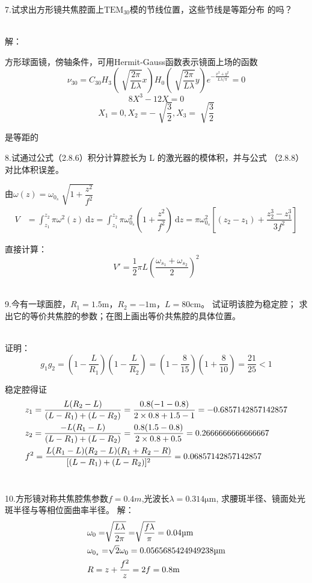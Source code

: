 \documentclass[12pt]{article}
\begin{document}
{\fangsong
7.试求出方形镜共焦腔面上$\mathrm{TEM_{30}}$模的节线位置，这些节线是等距分布
的吗？
}
{\kaishu\noindent
\\解：
\par 方形球面镜，傍轴条件，可用Hermit-Gauss函数表示镜面上场的函数
\[
	\nu_{30}=C_{30}
	H_3 \left( \sqrt[]{\dfrac{2\pi}{L\lambda} }x \right) 
	H_0 \left( \sqrt[]{\dfrac{2\pi}{L\lambda} }y \right) 
	e^{-\frac{x^2+y^2}{L\lambda/\pi} }=0
\]
\[
	8X^3-12X=0
\]
\[
	X_1=0,X_2=-\sqrt[]{\frac{3}{2} },X_3=\sqrt[]{\frac{3}{2} }
\]
\par 是等距的
\\}

{\fangsong
8.试通过公式（2.8.6）积分计算腔长为 L 的激光器的模体积，并与公式
（2.8.8）对比体积误差。
}
{\kaishu\noindent
\par 由$\omega(z)=\omega_{0_s}\sqrt[]{1+\dfrac{z^2}{f^2} }$
\begin{align*}
	V&
=\int_{{z_1}}^{{z_2}} {\pi\omega^2(z)} \: \mathrm{d}{z} {}
=\int_{{z_1}}^{{z_2}} {\pi\omega_{0_s}^2 \left( 1+\dfrac{z^2}{f^2}  \right)  } \: \mathrm{d}{z} {}
	=\pi\omega_{0_s}^2 \left[ (z_2-z_1)+\dfrac{z_2^3-z_1^3}{3f^2}  \right] 
\end{align*}
\par 直接计算： 
\[
	V'=\frac{1}{2} \pi L \left( \frac{\omega_{s_1}+\omega_{s_2}}{2}  \right) ^2
\]
\\}

{\fangsong
9.今有一球面腔，$R_1=1.5\si{\m}$，$R_2=-1\si{\m}$，$L=80\si{\cm}$。
试证明该腔为稳定腔；
求出它的等价共焦腔的参数；在图上画出等价共焦腔的具体位置。
}
{\kaishu\noindent
\\证明：
\[
 g_1g_2
 =\left(1-\frac{L}{R_1} \right)\left( 1-\frac{L}{R_2}  \right) 
 =\left( 1-\frac{8}{15}  \right) \left( 1+\frac{8}{10}  \right) 
 =\frac{21}{25} <1
\]
\par 稳定腔得证
\begin{align*}
	&z_1=\frac{L(R_2-L)}{(L-R_1)+(L-R_2)} = \frac{0.8(-1-0.8)}{2\times0.8+1.5-1} = \fpeval{-0.8*1.8/2.1}
\\	&z_2=\frac{-L(R_1-L)}{(L-R_1)+(L-R_2)} = \frac{0.8(1.5-0.8)}{2\times0.8+0.5} = \fpeval{0.8*0.7/2.1}
\\	&f^2=\frac{L(R_1-L)(R_2-L)(R_1+R_2-R)}{[(L-R_1)+(L-R_2)]^2} 
=\fpeval{0.8*(-1-0.8)*(1.5-0.8)*(-0.3)/2.1^2}
\end{align*}
\\}

{\fangsong
10.方形镜对称共焦腔焦参数$f=0.4\si{m}$,光波长$\lambda=0.314\si{\um}$,
求腰斑半径、镜面处光斑半径与等相位面曲率半径。
}
{\kaishu\noindent
解：
\begin{align*}
	&\omega_0=\sqrt[]{\frac{L\lambda}{2\pi} }=\sqrt[]{\frac{f\lambda}{\pi} }=\fpeval{0.4*0.314/3.14}\si{\um}
	\\&\omega_{0_s}=\sqrt[]{2}\omega_0=\fpeval{sqrt(2)*0.04}\si{\um}
	\\&R=z+\frac{f^2}{z} =2f=0.8\si{m}
\end{align*}
\\}
\end{document}
